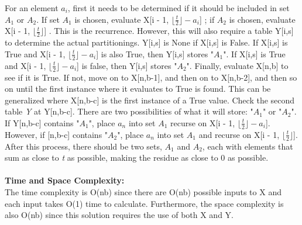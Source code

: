 \documentclass[11pt]{article}
\newcommand\floor[1]{\lfloor#1\rfloor}
\begin{document}
For an element $a_i$, first it needs to be determined if it should be included in set $\textit{A}_1$ or $\textit{A}_2$. If set $\textit{A}_1$ is chosen, evaluate X[i - 1, $ \floor{\frac{\textit{t}}{2}} - a_i$] ; if $\textit{A}_2$ is chosen, evaluate X[i - 1, $\floor{\frac{\textit{t}}{2}}$] . This is the recurrence. However, this will also require a table Y[i,s] to determine the actual partitionings. Y[i,s] is None if X[i,s] is False. If X[i,s] is True and X[i - 1, $\floor{\frac{\textit{t}}{2}} - a_i$] is also True, then Y[i,s] stores "$A_1$". If X[i,s] is True and X[i - 1, $\floor{\frac{\textit{t}}{2}} - a_i$] is false, then Y[i,s] stores "$A_2$". Finally, evaluate X[n,b] to see if it is True. If not, move on to X[n,b-1], and then on to X[n,b-2], and then so on until the first instance where it evaluates to True is found. This can be generalized where X[n,b-c] is
the first instance of a True value. Check the second table \textit{Y} at Y[n,b-c]. There are two possibilities of what it will store: "$A_1$" or "$A_2$". If Y[n,b-c] contains "$A_1$", place $a_n$ into set $\textit{A}_1$ recurse on X[i - 1, $\floor{\frac{\textit{t}}{2}} - a_i$]. However,  if [n,b-c] contains "$A_2$", place $a_n$ into set $\textit{A}_1$ and recurse on X[i - 1, $\floor{\frac{\textit{t}}{2}}$]. After this process, there should be two sets, $\textit{A}_1$ and $\textit{A}_2$, each with elements that sum as close to \textit{t} as possible, making the residue as close to 0 as possible. \\\\

\textbf{Time and Space Complexity:}\\
The time complexity is O(nb) since there are O(nb) possible inputs to X and each input takes O(1) time to calculate. Furthermore, the space complexity is also O(nb) since this solution requires the use of both X and Y. \\\\
\end{document}
